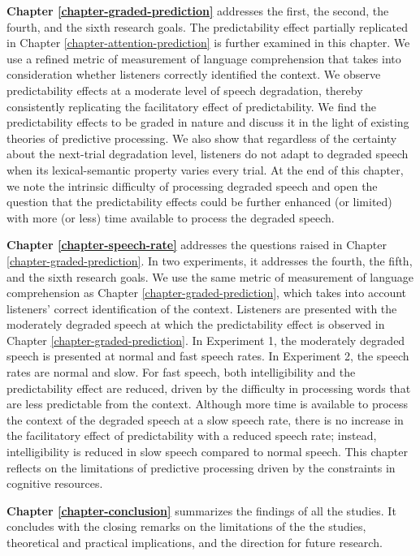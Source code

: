 \documentclass[a4paper, nobind]{templates/ociamthesis}
\begin{document}
\noindent
\textbf{Chapter \ref{chapter-graded-prediction}} addresses the first, the second, the fourth, and the sixth research goals.
The predictability effect partially replicated in Chapter \ref{chapter-attention-prediction} is further examined in this chapter.
We use a refined metric of measurement of language comprehension that takes into consideration whether listeners correctly identified the context.
We observe predictability effects at a moderate level of speech degradation, thereby consistently replicating the facilitatory effect of predictability.
We find the predictability effects to be graded in nature
and discuss it in the light of existing theories of predictive processing.
We also show that regardless of the certainty about the next-trial degradation level,
listeners do not adapt to degraded speech when its lexical-semantic property varies every trial.
At the end of this chapter, we note the intrinsic difficulty of processing degraded speech and open the question that the predictability effects could be further enhanced (or limited) with more (or less) time available to process the degraded speech.

\noindent
\textbf{Chapter \ref{chapter-speech-rate}} addresses the questions raised in Chapter \ref{chapter-graded-prediction}.
In two experiments, it addresses the fourth, the fifth, and the sixth research goals.
We use the same metric of measurement of language comprehension as Chapter \ref{chapter-graded-prediction}, which takes into account listeners' correct identification of the context.
Listeners are presented with the moderately degraded speech at which the predictability effect is observed in Chapter \ref{chapter-graded-prediction}.
In Experiment 1, the moderately degraded speech is presented at normal and fast speech rates.
In Experiment 2, the speech rates are normal and slow.
For fast speech, both intelligibility and the predictability effect are reduced, driven by the difficulty in processing words that are less predictable from the context.
Although more time is available to process the context of the degraded speech at a slow speech rate,
there is no increase in the facilitatory effect of predictability with a reduced speech rate;
instead, intelligibility is reduced in slow speech compared to normal speech.
This chapter reflects on the limitations of predictive processing driven by the constraints in cognitive resources.

\noindent
\textbf{Chapter \ref{chapter-conclusion}} summarizes the findings of all the studies.
It concludes with the closing remarks on the limitations of the the studies, theoretical and practical implications, and the direction for future research.
\end{document}
